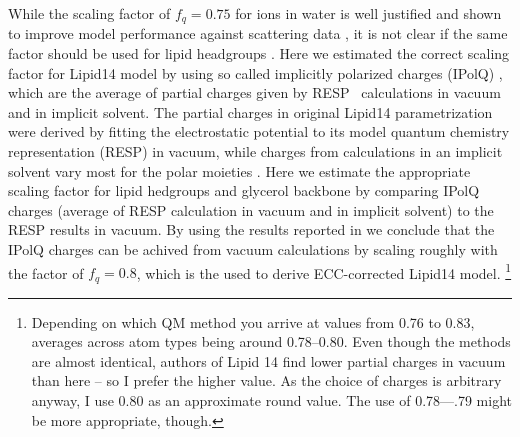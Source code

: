 \documentclass[aip,jcp,twocolumn]{revtex4}
\begin{document}
While the scaling factor of $f_q = 0.75$ for ions in water is well justified and shown
to improve model performance against scattering data \cite{kohagen14,kohagen16,??},
it is not clear if the same factor should be used for lipid headgroups .
Here we estimated the correct scaling factor for Lipid14 model by using
so called implicitly polarized charges (IPolQ) \cite{ipolq2013},
which are the average of partial charges given by RESP~\cite{RESP_paper} calculations in
vacuum and in implicit solvent.
The partial charges in original Lipid14 parametrization were derived by fitting the electrostatic 
potential to its model quantum chemistry representation (RESP\cite{RESP_paper}) in vacuum,
while charges from calculations in an implicit solvent vary most for the polar moieties \cite{maciejewski14}. 
Here we estimate the appropriate scaling factor for lipid hedgroups and glycerol backbone
by comparing IPolQ charges (average of RESP calculation in vacuum and in implicit solvent) to
the RESP results in vacuum. By using the results reported in \cite{maciejewski14} we conclude
that the IPolQ charges can be achived from vacuum calculations by scaling roughly with the
factor of $f_q=0.8$, which is the used to derive ECC-corrected Lipid14 model.
\footnote{Depending on which QM method you arrive at values from 0.76 to 0.83, averages across atom
  types being around 0.78--0.80. Even though the methods are almost identical, authors of Lipid 14 find lower
  partial charges in vacuum than here -- so I prefer the higher value. As the choice of charges is arbitrary anyway,
  I use 0.80 as an approximate round value. The use of 0.78---.79 might be more appropriate, though.}
\end{document}
